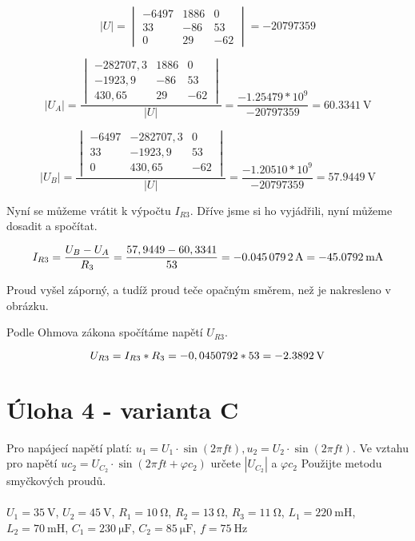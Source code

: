 \documentclass[11pt]{article}
\begin{document}
\[ |U| =
\begin{vmatrix}
	-6497 & 1886 & 0 \\ 
	33 & -86 & 53 \\ 
	0 & 29 & -62
\end{vmatrix}
= -20797359
\]

\[ |U_A| =
	\frac{
		\begin{vmatrix}
		-282707,3 & 1886 & 0 \\ 
		-1923,9 & -86 & 53 \\ 
		430,65 & 29 & -62
		\end{vmatrix}
	}{|U|}
	= \frac{-1.25479 * 10^9}{-20797359} = \SI{60,3341}{\volt}
\]

\[ |U_B| =
\frac{
	\begin{vmatrix}
	-6497 & -282707,3 & 0 \\ 
	33 & -1923,9 & 53 \\ 
	0 & 430,65 & -62
	\end{vmatrix}
}{|U|}
= \frac{-1.20510 * 10^9}{-20797359} = \SI{57,9449}{\volt}
\]

Nyní se můžeme vrátit k výpočtu \(I_{R3}\). Dříve jsme si ho vyjádřili, nyní můžeme dosadit a spočítat.

\[I_{R3} = \frac{U_B - U_A}{R_3} = \frac{57,9449 - 60,3341}{53} = \SI{-0,0450792}{\ampere} = \textbf{\SI{-45,0792}{\milli\ampere}} \]

Proud vyšel záporný, a tudíž proud teče opačným směrem, než je nakresleno v obrázku.

Podle Ohmova zákona spočítáme napětí \(U_{R3}\).

\[U_{R3} = I_{R3} * R_3 = -0,0450792 * 53 = \textbf{\SI{-2,3892}{\volt}} \]

\newpage
\section{Úloha 4 - varianta C}
Pro napájecí napětí platí: \(u_1 = U_1 \cdot \sin{(2\pi ft)}, u_2 = U_2 \cdot \sin{(2\pi ft)} \). Ve vztahu pro napětí \(u c_2 = U_{C_2} \cdot \sin{(2\pi ft + \varphi c_2)} \) určete \(|U_{C_2}| \) a \(\varphi c_2 \) Použijte metodu smyčkových proudů.
\\
\\
\(U_1 = \SI{35}{\volt}\),
\(U_2 = \SI{45}{\volt}\),
\(R_1 = \SI{10}{\ohm}\),
\(R_2 = \SI{13}{\ohm}\),
\(R_3 = \SI{11}{\ohm}\),
\(L_1 = \SI{220}{\milli\henry}\),
\(L_2 = \SI{70}{\milli\henry}\),
\(C_1 = \SI{230}{\micro\farad}\),
\(C_2 = \SI{85}{\micro\farad}\),
\(f = \SI{75}{\hertz}\)
\end{document}
